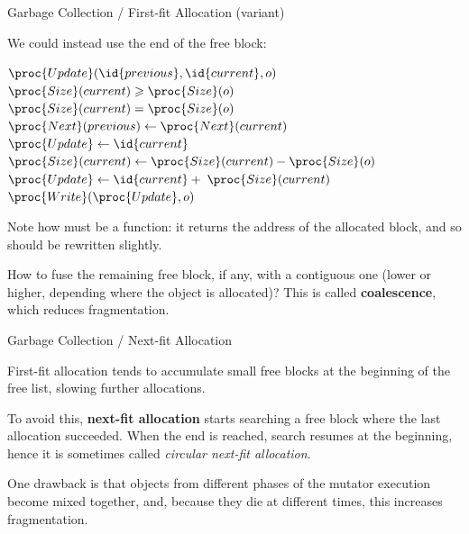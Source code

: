 \documentclass[compress,dvipdfmx]{beamer}
\begin{document}
%
\begin{frame}{Garbage Collection / First-fit Allocation (variant)}

  We could instead use the end of the free block:
  \begin{codebox}
    \(\proc{Update}(\id{previous}, \id{current}, o)\)\RComment
    \(\proc{Size}(current) \geqslant \proc{Size}(o)\)\\
    \li \If \(\proc{Size}(current) = \proc{Size}(o)\)
    \li \Then \(\proc{Next}(previous) \gets \proc{Next}(current)\)
    \li       \(\proc{Update} \gets \id{current}\)
    \li \Else \(\proc{Size}(current) \gets \proc{Size}(current) - \proc{Size}(o)\)
    \li       \(\proc{Update} \gets \id{current} + \; \proc{Size}(current)\)
        \End
    \li \(\proc{Write}(\proc{Update}, o)\)
  \end{codebox}
  Note how  must be a function: it returns the address of
  the allocated block, and so  should be rewritten
  slightly.

  \bigskip

  How to fuse the remaining free block, if any, with a contiguous one
  (lower or higher, depending where the object is allocated)? This is
  called \textbf{coalescence}, which reduces fragmentation.

\end{frame}

%
\begin{frame}{Garbage Collection / Next-fit Allocation}

  First-fit allocation tends to accumulate small free blocks at the
  beginning of the free list, slowing further allocations.

  \bigskip

  To avoid this, \textbf{next-fit allocation} starts searching a free
  block where the last allocation succeeded. When the end is reached,
  search resumes at the beginning, hence it is sometimes called
  \emph{circular next-fit allocation}.

  \bigskip

  One drawback is that objects from different phases of the mutator
  execution become mixed together, and, because they die at different
  times, this increases fragmentation.

\end{frame}
\end{document}
